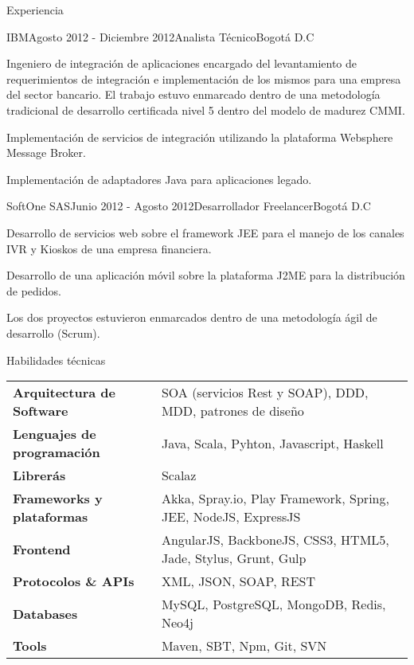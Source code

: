 \documentclass[spanish]{resume} %
\begin{document}
\begin{rSection}{Experiencia}

\begin{rSubsection}{IBM}{Agosto 2012 - Diciembre 2012}{Analista T\'ecnico}{Bogot\'a D.C}
\item Ingeniero de integraci\'on de aplicaciones encargado del levantamiento de requerimientos de integraci\'on e implementaci\'on de los mismos para una empresa del sector bancario. El trabajo estuvo enmarcado dentro de una metodolog\'ia tradicional de desarrollo certificada nivel 5 dentro del modelo de madurez CMMI.
\item Implementaci\'on de servicios de integraci\'on utilizando la plataforma Websphere Message Broker.
\item Implementaci\'on de adaptadores Java para aplicaciones legado.
\end{rSubsection}


\begin{rSubsection}{SoftOne SAS}{Junio 2012 - Agosto 2012}{Desarrollador Freelancer}{Bogot\'a D.C}
\item Desarrollo de servicios web sobre el framework JEE para el manejo de los canales IVR y Kioskos de una empresa financiera.
\item Desarrollo de una aplicaci\'on m\'ovil sobre la plataforma J2ME para la distribuci\'on de pedidos.
\item Los dos proyectos estuvieron enmarcados dentro de una metodolog\'ia \'agil de desarrollo (Scrum).
\end{rSubsection}

\end{rSection}


\begin{rSection}{Habilidades t\'ecnicas}

\begin{tabular}{ @{} >{\bfseries}l @{\hspace{6ex}} l }
Arquitectura de Software & SOA (servicios Rest y SOAP), DDD, MDD, patrones de dise\~no \\
Lenguajes de programaci\'on & Java, Scala, Pyhton, Javascript, Haskell \\
Librer\'as & Scalaz \\ 
Frameworks y plataformas & Akka, Spray.io, Play Framework, Spring, JEE, NodeJS, ExpressJS \\
Frontend & AngularJS, BackboneJS, CSS3, HTML5, Jade, Stylus, Grunt, Gulp \\
Protocolos \& APIs & XML, JSON, SOAP, REST \\
Databases & MySQL, PostgreSQL, MongoDB, Redis, Neo4j \\
Tools & Maven, SBT, Npm, Git, SVN
\end{tabular}

\end{rSection}
\end{document}
